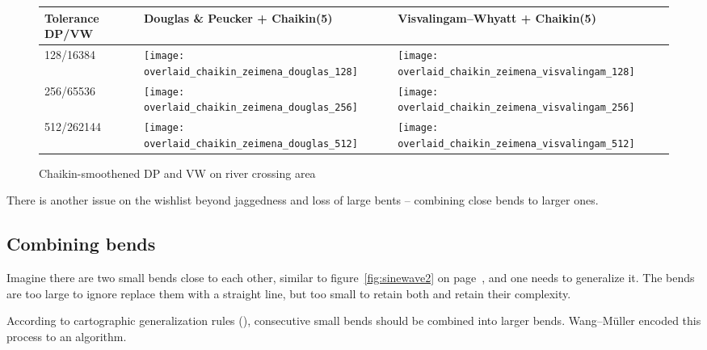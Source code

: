 \documentclass[a4paper]{article}
\newcommand{\DP}{Douglas \& Peucker}
\newcommand{\VW}{Visvalingam--Whyatt}
\newcommand{\WM}{Wang--M{\"u}ller}
\begin{document}
\begin{figure}[h]
    \renewcommand{\tabularxcolumn}[1]{>{\center\small}m{#1}}
    \begin{tabularx}{\textwidth}{ p{2.1cm} | X | X | }
        Tolerance DP/VW                                                              &
        {\DP} + Chaikin(5)                                                           &
        {\VW} + Chaikin(5)                                                           \tabularnewline \hline

        128/16384                                                                    &
        \texttt{[image: overlaid\_chaikin\_zeimena\_douglas\_128]}     &
        \texttt{[image: overlaid\_chaikin\_zeimena\_visvalingam\_128]} \tabularnewline \hline

        256/65536                                                                    &
        \texttt{[image: overlaid\_chaikin\_zeimena\_douglas\_256]}     &
        \texttt{[image: overlaid\_chaikin\_zeimena\_visvalingam\_256]} \tabularnewline \hline

        512/262144                                                                   &
        \texttt{[image: overlaid\_chaikin\_zeimena\_douglas\_512]}     &
        \texttt{[image: overlaid\_chaikin\_zeimena\_visvalingam\_512]} \tabularnewline \hline

    \end{tabularx}
    \caption{Chaikin-smoothened DP and VW on river crossing area}
    \label{tab:chaikin-crossing}
\end{figure}

There is another issue on the wishlist beyond jaggedness and loss of large bents
-- combining close bends to larger ones.

\subsection{Combining bends}

Imagine there are two small bends close to each other, similar to
figure~\ref{fig:sinewave2} on page~\pageref{fig:sinewave2}, and one needs to
generalize it. The bends are too large to ignore replace them with a straight
line, but too small to retain both and retain their complexity.

According to cartographic generalization rules
(\cite{miuller1995generalization}), consecutive small bends should be combined
into larger bends. {\WM} encoded this process to an algorithm.
\end{document}

